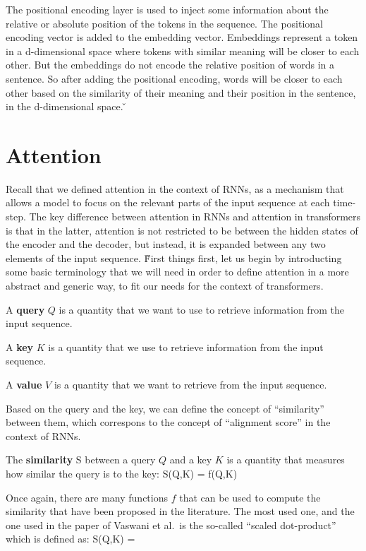 The positional encoding layer is used to inject some information about the relative or absolute position of the
tokens in the sequence. The positional encoding vector is added to the embedding vector. Embeddings represent a token
in a d-dimensional space where tokens with similar meaning will be closer to each other. But the embeddings do not
encode the relative position of words in a sentence. So after adding the positional encoding, words will be closer to
each other based on the similarity of their meaning and their position in the sentence, in the d-dimensional space.
\v

\section{Attention}

Recall that we defined attention in the context of RNNs, as a mechanism that allows a model to focus on the relevant
parts of the input sequence at each time-step. The key difference between attention in RNNs and attention in
transformers is that in the latter, attention is not restricted to be between the hidden states of the encoder and
the decoder, but instead, it is expanded between any two elements of the input sequence. \v

First things first, let us begin by introducting some basic terminology that we will need in order to define attention
in a more abstract and generic way, to fit our needs for the context of transformers.

\bd[Query]
A \textbf{query} $Q$ is a quantity that we want to use to retrieve information from the input sequence.
\ed

\bd[Key]
A \textbf{key} $K$ is a quantity that we use to retrieve information from the input sequence.
\ed

\bd[Value]
A \textbf{value} $V$ is a quantity that we want to retrieve from the input sequence.
\ed

Based on the query and the key, we can define the concept of ``similarity'' between them, which correspons to the
concept of ``alignment score'' in the context of RNNs.

\bd[Similarity]
The \textbf{similarity} S between a query $Q$ and a key $K$ is a quantity that measures how similar the query is to
the key:
\bse
S(Q,K) = f(Q,K)
\ese
\ed

Once again, there are many functions $f$ that can be used to compute the similarity that have been proposed in the
literature. The most used one, and the one used in the paper of Vaswani et al.\ is the so-called ``scaled dot-product''
which is defined as:
\bse
S(Q,K) = 
\ese

